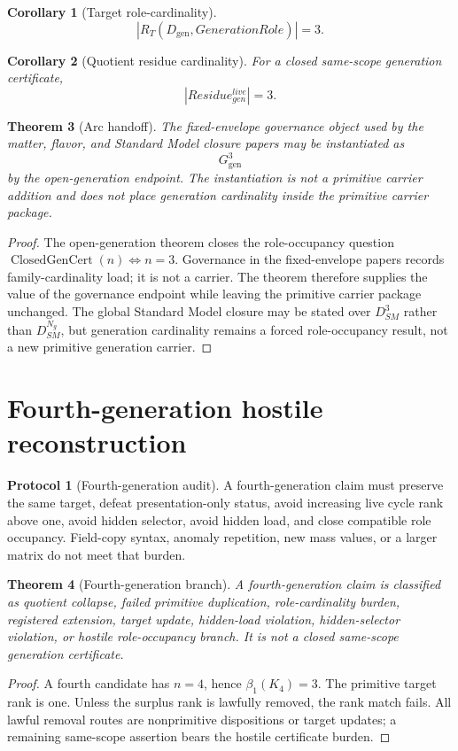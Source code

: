 \documentclass[11pt]{article}
\newcommand{\Dgen}{D_{\mathrm{gen}}}
\newcommand{\DSMN}{D_{SM}^{N_g}}
\newcommand{\DSMthree}{D_{SM}^{3}}
\newcommand{\ClosedGenCert}{\operatorname{ClosedGenCert}}
\newcommand{\GgenThree}{G_{\mathrm{gen}}^{3}}
\theoremstyle{definition}
\newtheorem{protocol}{Protocol}[section]
\theoremstyle{plain}
\newtheorem{theorem}{Theorem}[section]
\newtheorem{corollary}[theorem]{Corollary}
\theoremstyle{remark}
\begin{document}
\begin{corollary}[Target role-cardinality]
\[
|R_T(\Dgen,GenerationRole)|=3.
\]
\end{corollary}

\begin{corollary}[Quotient residue cardinality]
For a closed same-scope generation certificate,
\[
|Residue_{gen}^{live}|=3.
\]
\end{corollary}

\begin{theorem}[Arc handoff]
The fixed-envelope governance object used by the matter, flavor, and Standard Model closure papers may be instantiated as
\[
\GgenThree
\]
by the open-generation endpoint. The instantiation is not a primitive carrier addition and does not place generation cardinality inside the primitive carrier package.
\end{theorem}
\begin{proof}
The open-generation theorem closes the role-occupancy question \(\ClosedGenCert(n)\Longleftrightarrow n=3\). Governance in the fixed-envelope papers records family-cardinality load; it is not a carrier. The theorem therefore supplies the value of the governance endpoint while leaving the primitive carrier package unchanged. The global Standard Model closure may be stated over \(\DSMthree\) rather than \(\DSMN\), but generation cardinality remains a forced role-occupancy result, not a new primitive generation carrier.
\end{proof}

\section{Fourth-generation hostile reconstruction}

\begin{protocol}[Fourth-generation audit]
A fourth-generation claim must preserve the same target, defeat presentation-only status, avoid increasing live cycle rank above one, avoid hidden selector, avoid hidden load, and close compatible role occupancy. Field-copy syntax, anomaly repetition, new mass values, or a larger matrix do not meet that burden.
\end{protocol}

\begin{theorem}[Fourth-generation branch]
A fourth-generation claim is classified as quotient collapse, failed primitive duplication, role-cardinality burden, registered extension, target update, hidden-load violation, hidden-selector violation, or hostile role-occupancy branch. It is not a closed same-scope generation certificate.
\end{theorem}
\begin{proof}
A fourth candidate has \(n=4\), hence \(\beta_1(K_4)=3\). The primitive target rank is one. Unless the surplus rank is lawfully removed, the rank match fails. All lawful removal routes are nonprimitive dispositions or target updates; a remaining same-scope assertion bears the hostile certificate burden.
\end{proof}
\end{document}

